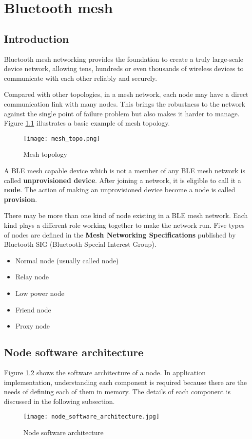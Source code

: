 \documentclass[../../main.tex]{subfiles}
\begin{document}
\chapter{Bluetooth mesh}

\section{Introduction}
Bluetooth mesh networking provides the foundation to create a truly large-scale device network, allowing tens, hundreds or even thousands of wireless devices to communicate with each other reliably and securely.

Compared with other topologies, in a mesh network, each node may have a direct communication link with many nodes. This brings the robustness to the network against the single point of failure problem but also makes it harder to manage. Figure \ref{fig:Mesh topology} illustrates a basic example of mesh topology.

\begin{figure}[ht]
    \begin{center}
        \texttt{[image: mesh\_topo.png]}
    \end{center}
    \caption{Mesh topology}
    \label{fig:Mesh topology}
\end{figure}

A BLE mesh capable device which is not a member of any BLE mesh network is called \textbf{unprovisioned device}. After joining a  network, it is eligible to call it a \textbf{node}. The action of making an unprovisioned device become a node is called \textbf{provision}.

There may be more than one kind of node existing in a BLE mesh network. Each kind plays a different role working together to make the network run. Five types of nodes are defined in the \textbf{Mesh Networking Specifications} published by Bluetooth SIG (Bluetooth Special Interest Group).
\begin{itemize}
    \item Normal node (usually called node)
    \item Relay node
    \item Low power node
    \item Friend node
    \item Proxy node
\end{itemize}
\section{Node software architecture}
Figure \ref{fig:Node software architecture} shows the software architecture of a node. In application implementation, understanding each component is required because there are the needs of defining each of them in memory. The details of each component is discussed in the following subsection.
\begin{figure}[ht]
    \begin{center}
        \texttt{[image: node\_software\_architecture.jpg]}
    \end{center}
    \caption{Node software architecture}
    \label{fig:Node software architecture}
\end{figure}
\end{document}
